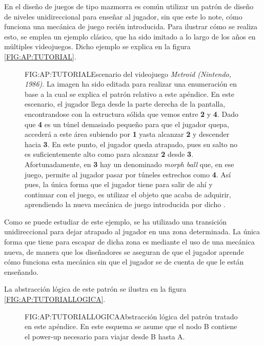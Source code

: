 En el diseño de juegos de tipo mazmorra es común utilizar un patrón de diseño de niveles unidireccional para enseñar al jugador, sin que este lo note, cómo funciona una mecánica de juego recién introducida.
Para ilustrar cómo se realiza esto, se emplea un ejemplo clásico, que ha sido imitado a lo largo de los años en múltiples videojuegos. Dicho ejemplo se explica en la figura \ref{FIG:AP:TUTORIAL}.

\begin{figure}{FIG:AP:TUTORIAL}{Escenario del videojuego \textit{Metroid\cite{metroid} (Nintendo, 1986)}. La imagen ha sido editada para realizar una enumeración en base a la cual se explica el patrón relativo a este apéndice. En este escenario, el jugador llega desde la parte derecha de la pantalla, encontrandose con la estructura sólida que vemos entre \textbf{2} y \textbf{4}. Dado que \textbf{4} es un túnel demasiado pequeño para que el jugador quepa, accederá a este área subiendo por \textbf{1} yasta alcanzar \textbf{2} y descender hacia \textbf{3}. En este punto, el jugador queda atrapado, pues su salto no es suficientemente alto como para alcanzar \textbf{2} desde \textbf{3}. Afortunadamente, en \textbf{3} hay un  denominado \textit{morph ball} que, en ese juego, permite al jugador pasar por túneles estrechos como \textbf{4}. Así pues, la única forma que el jugador tiene para salir de ahí y continuar con el juego, es utilizar el objeto que acaba de adquirir, aprendiendo la nueva mecánica de juego introducida por dicho .}
\end{figure}

Como se puede estudiar de este ejemplo, se ha utilizado una transición unidireccional para dejar atrapado al jugador en una zona determinada. La única forma que tiene para escapar de dicha zona es mediante el uso de una mecánica nueva, de manera que los diseñadores se aseguran de que el jugador aprende cómo funciona esta mecánica sin que el jugador se de cuenta de que le están enseñando.

La abstracción lógica de este patrón se ilustra en la figura \ref{FIG:AP:TUTORIALLOGICA}.

\begin{figure}{FIG:AP:TUTORIALLOGICA}{Abstracción lógica del patrón tratado en este apéndice. En este esquema se asume que el nodo B contiene el power-up necesario para viajar desde B hasta A.}
\end{figure}